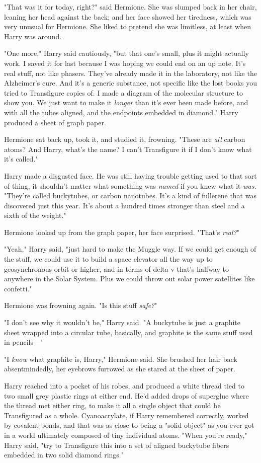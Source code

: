 "That was it for today, right?" said Hermione. She was slumped back in her
chair, leaning her head against the back; and her face showed her tiredness,
which was very unusual for Hermione. She liked to pretend she was limitless, at
least when Harry was around.

"One more," Harry said cautiously, "but that one's small, plus it might
actually work. I saved it for last because I was hoping we could end on an up
note. It's real stuff, not like phasers. They've already made it in the
laboratory, not like the Alzheimer's cure. And it's a generic substance, not
specific like the lost books you tried to Transfigure copies of. I made a
diagram of the molecular structure to show you. We just want to make it
\emph{longer} than it's ever been made before, and with all the tubes aligned,
and the endpoints embedded in diamond." Harry produced a sheet of graph paper.

Hermione sat back up, took it, and studied it, frowning. "These are \emph{all}
carbon atoms? And Harry, what's the name? I can't Transfigure it if I don't
know what it's called."

Harry made a disgusted face. He was still having trouble getting used to that
sort of thing, it shouldn't matter what something was \emph{named} if you knew
what it \emph{was.} "They're called buckytubes, or carbon nanotubes. It's a
kind of fullerene that was discovered just this year. It's about a hundred
times stronger than steel and a sixth of the weight."

Hermione looked up from the graph paper, her face surprised. "That's
\emph{real?}"

"Yeah," Harry said, "just hard to make the Muggle way. If we could get enough
of the stuff, we could use it to build a space elevator all the way up to
geosynchronous orbit or higher, and in terms of delta-v that's halfway to
anywhere in the Solar System. Plus we could throw out solar power satellites
like confetti."

Hermione was frowning again. "Is this stuff \emph{safe?}"

"I don't see why it wouldn't be," Harry said. "A buckytube is just a graphite
sheet wrapped into a circular tube, basically, and graphite is the same stuff
used in pencils---"

"I \emph{know} what graphite is, Harry," Hermione said. She brushed her hair
back absentmindedly, her eyebrows furrowed as she stared at the sheet of paper.

Harry reached into a pocket of his robes, and produced a white thread tied to
two small grey plastic rings at either end. He'd added drops of superglue where
the thread met either ring, to make it all a single object that could be
Transfigured as a whole. Cyanoacrylate, if Harry remembered correctly, worked
by covalent bonds, and that was as close to being a "solid object" as you ever
got in a world ultimately composed of tiny individual atoms. "When you're
ready," Harry said, "try to Transfigure this into a set of aligned buckytube
fibers embedded in two solid diamond rings."

